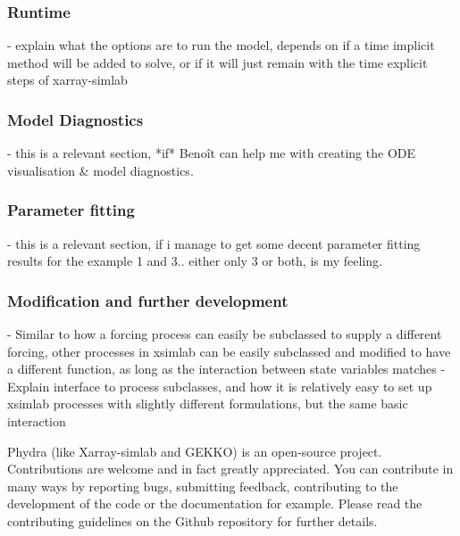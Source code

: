 \documentclass[template.tex]{subfiles}
\begin{document}
\subsubsection{Runtime}
- explain what the options are to run the model, depends on if a time implicit method will be added to solve, or if it will just remain with the time explicit steps of xarray-simlab

\subsubsection{Model Diagnostics}
- this is a relevant section, *if* Benoît can help me with creating the ODE visualisation & model diagnostics.

\subsubsection{Parameter fitting}
- this is a relevant section, if i manage to get some decent parameter fitting results for the example 1 and 3.. either only 3 or both, is my feeling. 


\subsubsection{Modification and further development}

- Similar to how a forcing process can easily be subclassed to supply a different forcing, other processes in xsimlab can be easily subclassed and modified to have a different function, as long as the interaction between state variables matches
- Explain interface to process subclasses, and how it is relatively easy to set up xsimlab processes with slightly different  formulations, but the same basic interaction

Phydra (like Xarray-simlab and GEKKO) is an open-source project. Contributions are welcome and in fact greatly appreciated. You can contribute in many ways by reporting bugs, submitting feedback, contributing to the development of the code or the documentation for example. Please read the contributing guidelines on the Github repository for further details.
\end{document}
